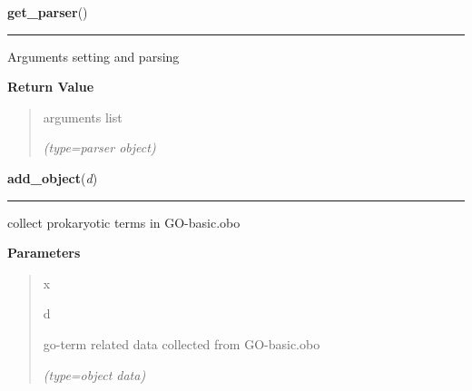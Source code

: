 \hspace{.8\funcindent}\begin{boxedminipage}{\funcwidth}

    \raggedright \textbf{get\_parser}()

    \vspace{-1.5ex}

    \rule{\textwidth}{0.5\fboxrule}
\setlength{\parskip}{2ex}
    Arguments setting and parsing

\setlength{\parskip}{1ex}
      \textbf{Return Value}
    \vspace{-1ex}

      \begin{quote}
      arguments list

      {\it (type=parser object)}

      \end{quote}

    \end{boxedminipage}

    \label{GOtrimmer:add_object}

    \vspace{0.5ex}

\hspace{.8\funcindent}\begin{boxedminipage}{\funcwidth}

    \raggedright \textbf{add\_object}(\textit{d})

    \vspace{-1.5ex}

    \rule{\textwidth}{0.5\fboxrule}
\setlength{\parskip}{2ex}
    collect prokaryotic terms in GO-basic.obo

\setlength{\parskip}{1ex}
      \textbf{Parameters}
      \vspace{-1ex}

      \begin{quote}
        \begin{Ventry}{x}

          \item[d]

          go-term related data collected from GO-basic.obo

            {\it (type=object data)}

        \end{Ventry}

      \end{quote}

    \end{boxedminipage}

